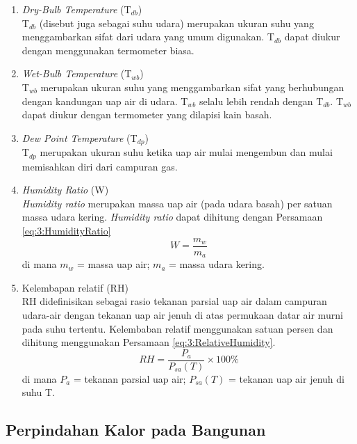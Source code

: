 \begin{enumerate}
	\item \textit{Dry-Bulb Temperature} (T$_{db}$) \\
	T$_{db}$ (disebut juga sebagai suhu udara) merupakan ukuran suhu yang menggambarkan sifat dari udara yang umum digunakan. T$_{db}$ dapat diukur dengan menggunakan termometer biasa.
	
	\item \textit{Wet-Bulb Temperature} (T$_{wb}$) \\
	T$_{wb}$ merupakan ukuran suhu yang menggambarkan sifat yang berhubungan dengan kandungan uap air di udara. T$_{wb}$ selalu lebih rendah dengan T$_{db}$. T$_{wb}$ dapat diukur dengan termometer yang dilapisi kain basah.
	
	\item \textit{Dew Point Temperature} (T$_{dp}$) \\
	T$_{dp}$ merupakan ukuran suhu ketika uap air mulai mengembun dan mulai memisahkan diri dari campuran gas.
	
	\item \textit{Humidity Ratio} (W)\\
	\textit{Humidity ratio} merupakan massa uap air (pada udara basah) per satuan massa udara kering. \textit{Humidity ratio} dapat dihitung dengan Persamaan \ref{eq:3:HumidityRatio}\\
	\begin{equation} \label{eq:3:HumidityRatio}
		W = \frac{m_w}{m_a} 
	\end{equation}
	di mana $m_w$ = massa uap air; $m_a$ = massa udara kering.
	
	\item Kelembapan relatif (RH) \\
	RH didefinisikan sebagai rasio tekanan parsial uap air dalam campuran udara-air dengan tekanan uap air jenuh di atas permukaan datar air murni pada suhu tertentu. Kelembaban relatif menggunakan satuan persen dan dihitung menggunakan Persamaan \ref{eq:3:RelativeHumidity}.
	\begin{equation} \label{eq:3:RelativeHumidity}
	RH = \frac{P_a}{P_{sa}(T)} \times 100\% 
	\end{equation}
	di mana $P_a$ = tekanan parsial uap air; $P_{sa}(T)$ = tekanan uap air jenuh di suhu T.
\end{enumerate}

\subsection{Perpindahan Kalor pada Bangunan}

